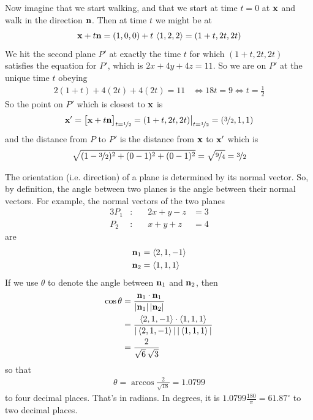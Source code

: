 \begin{eg}
Now imagine that we start walking, and that we start at time $t=0$ at $\mathbf{x}$ 
and walk in the direction $\mathbf{n}$. Then at time $t$ we might be at
\begin{equation*}
\mathbf{x}+t\mathbf{n} = (1,0,0) +t\,\left< 1,2,2\right>
         = (1+t, 2t, 2t)
\end{equation*}
We hit the second plane $P'$ at exactly the time $t$ for which 
$(1+t, 2t, 2t)$ satisfies the equation for $P'$, which is 
$2x+4y+4z=11$. So we are on $P'$ at the unique time $t$ obeying
\begin{align*}
2(1+t)+4(2t)+4(2t)=11
&\iff 18t = 9 
\iff t=\frac{1}{2}
\end{align*}
So the point on $P'$ which is closest to $\mathbf{x}$ is
\begin{align*}
\mathbf{x}' = \big[\mathbf{x}+t\mathbf{n}\big]_{t=\nicefrac{1}{2}} 
     = (1+t, 2t, 2t)\big|_{t=\nicefrac{1}{2}}
     = (\nicefrac{3}{2}, 1, 1) 
\end{align*}
and the distance from $P$ to $P'$ is the distance from
$\mathbf{x}$ to $\mathbf{x}'$ which is
\begin{align*}
\sqrt{(1-\nicefrac{3}{2})^2+(0-1)^2+(0-1)^2}
=\sqrt{\nicefrac{9}{4}}
=\nicefrac{3}{2}
\end{align*}
\end{eg}

\begin{eg}\label{eg:VPangle-Planes}
The orientation (i.e. direction) of a plane is determined by its normal vector.
So, by definition, the angle between two planes is the angle between their
normal vectors. For example, the normal vectors of the two planes
\begin{alignat*}{3}
P_1&:\quad & 2x+y-z&=3\\
P_2&: &  x+y+z&=4
\end{alignat*} 
are
\begin{align*}
\mathbf{n}_1&=\left< 2,1,-1\right> \\
\mathbf{n}_2&=\left< 1,1,1\right>
\end{align*}
If we use $\theta$ to denote the angle between $\mathbf{n}_1$ and $\mathbf{n}_2$, then
\begin{align*}
\cos\theta &=\frac{\mathbf{n}_1\cdot\mathbf{n}_1}{|\mathbf{n}_1|\,|\mathbf{n}_2|} \\
           &=\frac{\left< 2,1,-1\right>\cdot\left< 1,1,1\right>}
                       {|\left< 2,1,-1\right>|\,|\left< 1,1,1\right>|} \\
           &=\frac{2}{\sqrt{6}\,\sqrt{3}}
\end{align*} 
so that
\begin{align*}
\theta =\arccos\frac{2}{\sqrt{18}} =1.0799
\end{align*}
to four decimal places. That's in radians. In degrees, it is
$1.0799\frac{180}{\pi}=61.87^\circ$ to two decimal places.
\end{eg}



